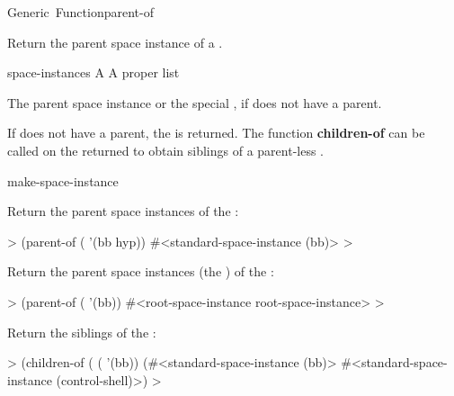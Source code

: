 \documentclass[10pt,twoside,english,pdftex]{article}
\begin{document}
\begin{functiondoc}{Generic~Function}{parent-of}%
  {
    \returns{} }
%

\fnsyntax

\fnpurpose Return the parent space instance of a .

\fnmethods
{}%
  {\code{(} 
    \returns{} }

\fnpackage {}

\fnmodule {}

\fnargs
\begin{args}{space-instances}
 A 
 A proper list
\end{args}

\fnreturns The parent space instance or the special
, if  does not have a
parent.

\fndescription If  does not have a parent, the
 is returned.  The function
\textbf{children-of} can be called on the returned
 to obtain siblings of a parent-less
.

\begin{alsos}{make-space-instance}
\also[children-of]
\end{alsos}

\fnexamples
{}%
%
Return the parent space instances of the  
:
%
\W\supp
\begin{example}
  > (parent-of ( '(bb hyp))
  #<standard-space-instance (bb)>
  >
\end{example}
%
Return the parent space instances (the ) of
the  :
%
\W\supp\notpretop
\begin{example}
  > (parent-of ( '(bb))
  #<root-space-instance root-space-instance>
  >
\end{example}
%
Return the siblings of the  :
%
\W\supp\notpretop
\begin{example}
  > (children-of
      ( ( '(bb))
  (#<standard-space-instance (bb)>
   #<standard-space-instance (control-shell)>)
  >
\end{example}

\end{functiondoc}
\end{document}

